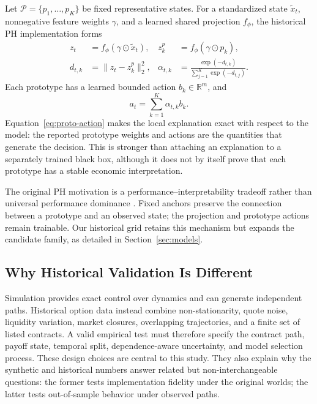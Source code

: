 \documentclass[conference]{IEEEtran}
\begin{document}
Let $\mathcal P=\{p_1,\ldots,p_K\}$ be fixed representative states. For a
standardized state $\widetilde{x}_t$, nonnegative feature weights $\gamma$, and
a learned shared projection $f_\phi$, the historical PH implementation forms
\begin{align}
z_t &=f_\phi(\gamma\odot\widetilde{x}_t), &
z_k^p&=f_\phi(\gamma\odot p_k),\\
d_{t,k}&=\|z_t-z_k^p\|_2^2, &
\alpha_{t,k}&=\frac{\exp(-d_{t,k})}
{\sum_{j=1}^{K}\exp(-d_{t,j})}.
\label{eq:similarity}
\end{align}
Each prototype has a learned bounded action $b_k\in\mathbb R^m$, and
\begin{equation}
    a_t=\sum_{k=1}^{K}\alpha_{t,k}b_k.
    \label{eq:proto-action}
\end{equation}
Equation~\eqref{eq:proto-action} makes the local explanation exact with respect
to the model: the reported prototype weights and actions are the quantities
that generate the decision. This is stronger than attaching an explanation to
a separately trained black box, although it does not by itself prove that each
prototype has a stable economic interpretation.

The original PH motivation is a performance--interpretability tradeoff rather
than universal performance dominance \cite{faloughi2025protohedge}. Fixed
anchors preserve the connection between a prototype and an observed state;
the projection and prototype actions remain trainable. Our historical grid
retains this mechanism but expands the candidate family, as detailed in
Section~\ref{sec:models}.

\subsection{Why Historical Validation Is Different}

Simulation provides exact control over dynamics and can generate independent
paths. Historical option data instead combine non-stationarity, quote noise,
liquidity variation, market closures, overlapping trajectories, and a finite
set of listed contracts. A valid empirical test must therefore specify the
contract path, payoff state, temporal split, dependence-aware uncertainty, and
model selection process. These design choices are central to this study. They
also explain why the synthetic and historical numbers answer related but
non-interchangeable questions: the former tests implementation fidelity under
the original worlds; the latter tests out-of-sample behavior under observed
paths.
\end{document}
